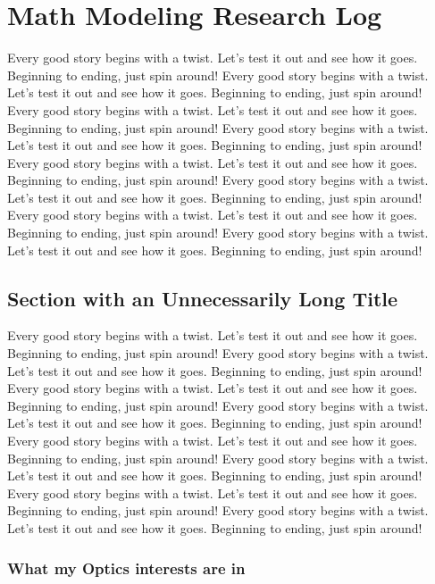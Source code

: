 \chapter{Math Modeling Research Log}

Every good story begins with a twist. Let's test it out and see how it goes. Beginning to ending, just spin around! Every good story begins with a twist. Let's test it out and see how it goes. Beginning to ending, just spin around! Every good story begins with a twist. Let's test it out and see how it goes. Beginning to ending, just spin around! Every good story begins with a twist. Let's test it out and see how it goes. Beginning to ending, just spin around! Every good story begins with a twist. Let's test it out and see how it goes. Beginning to ending, just spin around! Every good story begins with a twist. Let's test it out and see how it goes. Beginning to ending, just spin around! Every good story begins with a twist. Let's test it out and see how it goes. Beginning to ending, just spin around! Every good story begins with a twist. Let's test it out and see how it goes. Beginning to ending, just spin around!

\section[What my Optics Studies have been]{Section with an Unnecessarily Long Title}

Every good story begins with a twist. Let's test it out and see how it goes. Beginning to ending, just spin around! Every good story begins with a twist. Let's test it out and see how it goes. Beginning to ending, just spin around! Every good story begins with a twist. Let's test it out and see how it goes. Beginning to ending, just spin around! Every good story begins with a twist. Let's test it out and see how it goes. Beginning to ending, just spin around! Every good story begins with a twist. Let's test it out and see how it goes. Beginning to ending, just spin around! Every good story begins with a twist. Let's test it out and see how it goes. Beginning to ending, just spin around! Every good story begins with a twist. Let's test it out and see how it goes. Beginning to ending, just spin around! Every good story begins with a twist. Let's test it out and see how it goes. Beginning to ending, just spin around!

\subsection{What my Optics interests are in}

